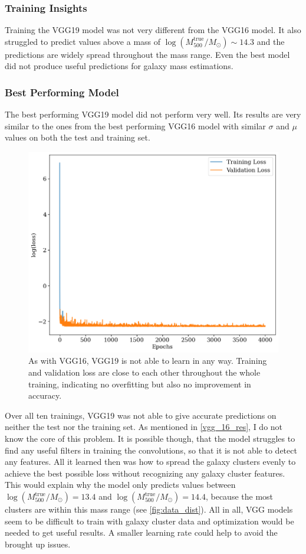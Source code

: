 \subsubsection*{Training Insights}
Training the VGG19 model was not very different from the VGG16 model. It also struggled to predict values above a mass of $\log{(M_{500}^{\text{true}}/M_{\odot})} \sim 14.3$ and the predictions are widely spread throughout the mass range. Even the best model did not produce useful predictions for galaxy mass estimations.


\subsubsection*{Best Performing Model}
The best performing VGG19 model did not perform very well. Its results are very similar to the ones from the best performing VGG16 model with similar $\sigma$ and $\mu$ values on both the test and training set.

\begin{figure}[h]
\centering
\includegraphics[width=.667\textwidth]{images/Chapter4/VGG19/vgg19_history.png}
\caption{As with VGG16, VGG19 is not able to learn in any way. Training and validation loss are close to each other throughout the whole training, indicating no overfitting but also no improvement in accuracy. } 
\label{fig:vgg19_best_history}
\end{figure}


Over all ten trainings, VGG19 was not able to give accurate predictions on neither the test nor the training set. As mentioned in \cref{vgg_16_res}, I do not know the core of this problem. It is possible though, that the model struggles to find any useful filters in training the convolutions, so that it is not able to detect any features. All it learned then was how to spread the galaxy clusters evenly to achieve the best possible loss without recognizing any galaxy cluster features. This would explain why the model only predicts values between $\log{(M_{500}^{\text{true}}/M_{\odot})} = 13.4$ and $\log{(M_{500}^{\text{true}}/M_{\odot})} = 14.4$, because the most clusters are within this mass range (see \autoref{fig:data_dist}).
All in all, VGG models seem to be difficult to train with galaxy cluster data and optimization would be needed to get useful results. A smaller learning rate could help to avoid the brought up issues.


